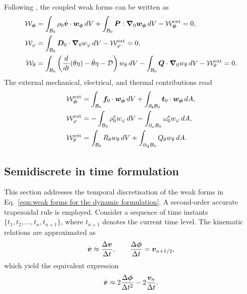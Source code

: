 Following \cite{XX}, the coupled weak forms can be written as
%
\begin{equation}\label{eqn:weak forms for the dynamic formulation}
	\begin{aligned}
		\mathcal{W}_{\boldsymbol{\phi}} &=
		\int_{\mathcal{B}_0}\rho_0 \dot{\boldsymbol{v}}\cdot\boldsymbol{w}_{\boldsymbol{\phi}}\,dV 
		+ \int_{\mathcal{B}_0}\boldsymbol{P}:\boldsymbol{\nabla}_0\boldsymbol{w}_{\boldsymbol{\phi}}\,dV 
		- \mathcal{W}^{\text{ext}}_{\boldsymbol{\phi}} = 0, \\
		\mathcal{W}_{\varphi} &=
		\int_{\mathcal{B}_0}\boldsymbol{D}_0\cdot\boldsymbol{\nabla}_0 w_{\varphi}\,dV 
		- \mathcal{W}_{\varphi}^{\text{ext}} = 0, \\
		\mathcal{W}_{\theta} &=
		\int_{\mathcal{B}_0}\left(\frac{d}{dt}(\theta\eta) - \dot{\theta}\eta - \mathcal{D}\right) w_{\theta}\,dV 
		- \int_{\mathcal{B}_0}\boldsymbol{Q}\cdot\boldsymbol{\nabla}_0 w_{\theta}\,dV 
		- \mathcal{W}_{\theta}^{\text{ext}} = 0.
	\end{aligned}
\end{equation}
%
The external mechanical, electrical, and thermal contributions read
%
\begin{equation}
	\begin{aligned}
		\mathcal{W}_{\boldsymbol{\phi}}^{\text{ext}} &=
		\int_{\mathcal{B}_0}\boldsymbol{f}_0\cdot\boldsymbol{w}_{\boldsymbol{\phi}}\,dV
		+ \int_{\partial_{\boldsymbol{t}}\mathcal{B}_0}\boldsymbol{t}_0\cdot\boldsymbol{w}_{\boldsymbol{\phi}}\,dA, \\
		\mathcal{W}_{\varphi}^{\text{ext}} &=
		- \int_{\mathcal{B}_0}\rho_0^e w_{\varphi}\,dV
		- \int_{\partial_{\omega}\mathcal{B}_0}\omega_0^e w_{\varphi}\,dA, \\
		\mathcal{W}_{\theta}^{\text{ext}} &=
		\int_{\mathcal{B}_0} R_{\theta} w_{\theta}\,dV
		+ \int_{\partial_{Q}\mathcal{B}_0} Q_{\theta} w_{\theta}\,dA.
	\end{aligned}
\end{equation}


\subsection{Semidiscrete in time formulation}

This section addresses the temporal discretisation of the weak forms in Eq.~\eqref{eqn:weak forms for the dynamic formulation}. 
A second-order accurate trapezoidal rule is employed. 
Consider a sequence of time instants $\{t_1, t_2, \ldots, t_n, t_{n+1}\}$, where $t_{n+1}$ denotes the current time level. 
The kinematic relations are approximated as
%
\begin{equation}\label{eqn:time discretisation kinematics}
	\dot{\boldsymbol{v}} \approx \frac{\Delta \boldsymbol{v}}{\Delta t},
	\qquad 
	\frac{\Delta \boldsymbol{\phi}}{\Delta t} = \boldsymbol{v}_{n+1/2},
\end{equation}
%
which yield the equivalent expression
%
\begin{equation*}
	\dot{\boldsymbol{v}} \approx 2\frac{\Delta \boldsymbol{\phi}}{\Delta t^2} - 2\frac{\boldsymbol{v}_n}{\Delta t}.
\end{equation*}

